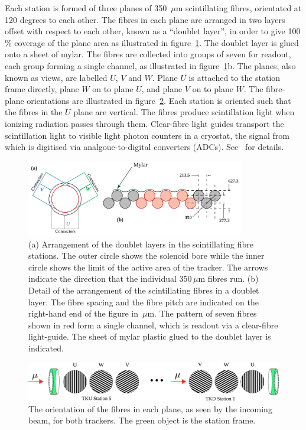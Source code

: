   Each station is formed of three planes of 350~$\mu$m scintillating fibres, orientated at 120 degrees to each other. The fibres in each plane are arranged in two layers offset with respect to each other, known as a ``doublet layer'', in order to give 100$\%$ coverage of the plane area as illustrated in figure~\ref{fig:DoubletLayer}. The doublet layer is glued onto a sheet of mylar. The fibres are collected into groups of seven for readout, each group forming a single channel, as illustrated in figure~\ref{fig:DoubletLayer}b. The planes, also known as views, are labelled $U$, $V$ and $W$. Plane $U$ is attached to the station frame directly, plane $W$ on to plane $U$, and plane $V$ on to plane $W$. The fibre-plane orientations are illustrated in figure~\ref{fig:FibrePlaneOrientation}. Each station is oriented such that the fibres in the $U$ plane are vertical. The fibres produce scintillation light when ionizing radiation passes through them. Clear-fibre light guides transport the scintillation light to visible light photon counters in a cryostat, the signal from which is digitised via analgoue-to-digital converters (ADCs). See~\cite{MiceTrackers} for details.

  \begin{figure}[tbh]
    \begin{center}
      \includegraphics[width=0.85\textwidth]{01-MICE/doublet-layer.pdf}
      \caption{\label{fig:DoubletLayer}(a) Arrangement of the doublet layers in the scintillating fibre  stations. The outer circle shows the solenoid bore while the inner circle shows the limit of the active area of the tracker. The arrows indicate the direction that the individual 350\,$\mu$m fibres run. (b) Detail of the arrangement of the scintillating fibres in a doublet layer. The fibre spacing and the fibre pitch are indicated on the right-hand end of the figure in \,$\mu$m. The pattern of seven fibres shown in red form a single channel, which is readout via a clear-fibre light-guide. The sheet of mylar plastic glued to the doublet layer is indicated. }
    \end{center}
  \end{figure}

  \begin{figure}[tbh]
    \centering
    \includegraphics[width=0.95\linewidth]{01-MICE/FibrePlaneOrientation.pdf} \hspace{2pc}%
    \caption{\label{fig:FibrePlaneOrientation} The orientation of the fibres in each plane, as seen by the incoming beam, for both trackers. The green object is the station frame.}
  \end{figure}
